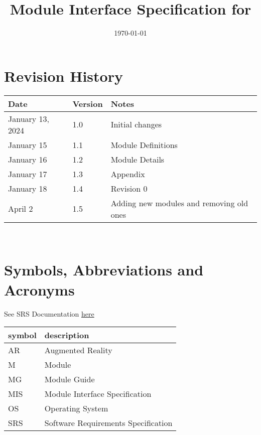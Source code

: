\documentclass[12pt, titlepage]{article}
\begin{document}
\title{Module Interface Specification for \progname{}}

\author{\authname}

\date{\today}

\maketitle


\section{Revision History}

\begin{tabularx}{\textwidth}{p{3cm}p{2cm}X}
\toprule {\bf Date} & {\bf Version} & {\bf Notes}\\
\midrule
January 13, 2024 & 1.0 & Initial changes\\
January 15 & 1.1 & Module Definitions\\
January 16 & 1.2 & Module Details\\
January 17 & 1.3 & Appendix\\
January 18 & 1.4 & Revision 0\\
April 2 & 1.5 & Adding new modules and removing old ones\\
\bottomrule
\end{tabularx}

~\newpage

\section{Symbols, Abbreviations and Acronyms}

See SRS Documentation \href{https://github.com/SammyG7/Mac-AR/blob/main/docs/SRS/SRS.pdf} {here}\\


\renewcommand{\arraystretch}{1.2}
\begin{tabular}{l l} 
  \toprule		
  \textbf{symbol} & \textbf{description}\\
  \midrule 
  AR & Augmented Reality\\
  M & Module \\
  MG & Module Guide \\
  MIS & Module Interface Specification\\
  OS & Operating System \\
  SRS & Software Requirements Specification\\
  \bottomrule
\end{tabular}\\
\end{document}
